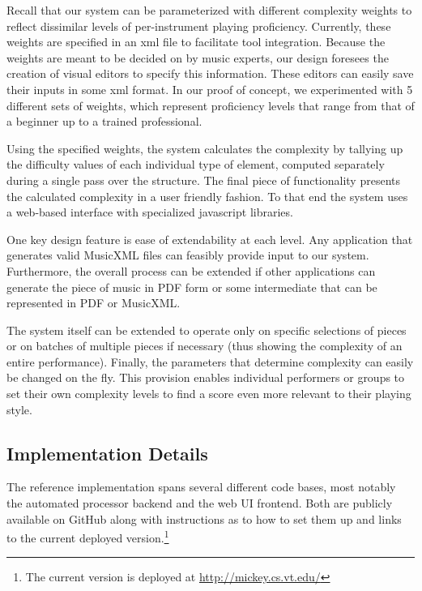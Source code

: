 \documentclass[10pt,preprint]{sigplanconf}
\begin{document}
Recall that our system can be parameterized with different complexity weights to reflect dissimilar levels of per-instrument playing proficiency. Currently, these weights are specified in an xml file to facilitate tool integration. Because the weights are meant to be decided on by music experts, our design foresees the creation of visual editors to specify this information. These editors can easily save their inputs in some xml format. In our proof of concept, we experimented with 5 different sets of weights, which represent proficiency levels that range from that of a beginner up to a trained professional.

Using the specified weights, the system calculates the complexity by tallying up the difficulty values of each individual type of element, computed separately during a single pass over the structure. The final piece of functionality presents the calculated complexity in a user friendly fashion. To that end the system uses a web-based interface with specialized javascript libraries.

One key design feature is ease of extendability at each level. Any application that generates valid MusicXML files can feasibly provide input to our system. Furthermore, the overall process can be extended if other applications can generate the piece of music in PDF form or some intermediate that can be represented in PDF or MusicXML.

The system itself can be extended to operate only on specific selections of pieces or on batches of multiple pieces if necessary (thus showing the complexity of an entire performance). Finally, the parameters that determine complexity can easily be changed on the fly. This provision enables individual performers or groups to set their own complexity levels to find a score even more relevant to their playing style.



\subsection{Implementation Details} 
\label{sec:details}

The reference implementation spans several different code bases, most notably the automated processor backend and the web UI frontend. Both are publicly available on GitHub \cite{GithubMusicScoring} along with instructions as to how to set them up and links to the current deployed version.\footnote{The current version is deployed at \url{http://mickey.cs.vt.edu/}}
\end{document}
